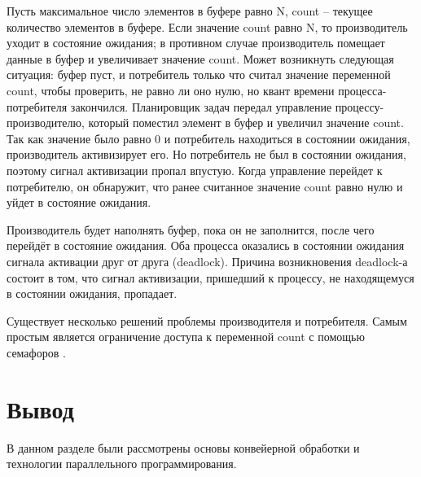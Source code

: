         Пусть максимальное число элементов в буфере равно N,
        count -- текущее количество элементов в буфере.
        Если значение count равно N, то производитель уходит в состояние ожидания;
        в противном случае производитель помещает данные в буфер и увеличивает значение count.
        Может возникнуть следующая ситуация: буфер пуст, и потребитель только что считал значение перемен­ной count,
        чтобы проверить, не равно ли оно нулю, но квант времени процесса-потребителя закончился.
        Планировщик задач передал управление процессу-производителю,
        который поместил элемент в буфер и увеличил значение count.
        Так как значение было равно 0 и потребитель находиться в состоянии ожидания,
        производитель активизирует его. Но потребитель не был в состоянии ожидания,
        поэтому сигнал активизации про­пал впустую. 
        Когда управление перейдет к потребителю, 
        он обнаружит, что ранее считанное значение count равно нулю и уйдет в состояние ожидания.

        Производитель будет наполнять буфер, пока он не заполнится, после чего перейдёт в состояние ожидания.
        Оба процесса оказались в состоянии ожидания сигнала активации друг от друга (deadlock).
        Причина возникновения deadlock-а состоит в том,
        что сигнал активизации, при­шедший к процессу,
        не находящемуся в состоянии ожидания, пропадает.

        Существует несколько решений проблемы производителя и потребителя. 
        Самым простым является ограничение доступа к переменной 
        count с помощью семафоров \cite{problem-producer-consumer}.  
        
    \section{Вывод}
        В данном разделе были рассмотрены основы конвейерной обработки и технологии параллельного программирования.

\newpage
